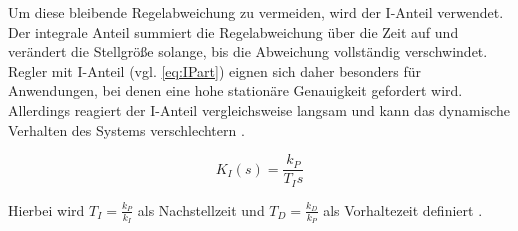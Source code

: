 Um diese bleibende Regelabweichung zu vermeiden, wird der I-Anteil verwendet. Der integrale Anteil summiert die Regelabweichung über die Zeit auf und verändert die Stellgröße solange, bis die Abweichung vollständig verschwindet. Regler mit I-Anteil (vgl. \eqref{eq:IPart}) eignen sich daher besonders für Anwendungen, bei denen eine hohe stationäre Genauigkeit gefordert wird. Allerdings reagiert der I-Anteil vergleichsweise langsam und kann das dynamische Verhalten des Systems verschlechtern \cite{Lunze:2020}. 
\begin{center}
	\begin{equation}
		K_I(s) =  \frac{k_P}{T_{I}s}
	\end{equation}
	\label{eq:IPart}
\end{center}
Hierbei wird $ T_I =  \frac{k_P}{k_I}$ als Nachstellzeit und  $T_D = \frac{k_D}{k_P}$ als Vorhaltezeit definiert \cite{Lunze:2020}.

